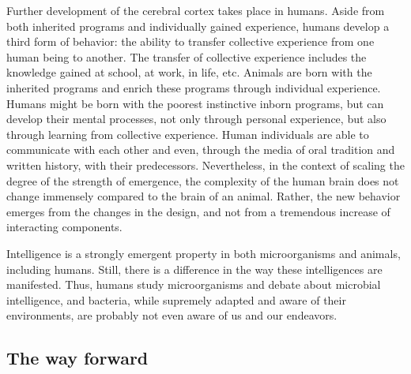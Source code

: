 Further development of the cerebral cortex takes place in humans. Aside from both inherited programs and individually gained experience, humans develop a third form of behavior: the ability to transfer collective experience from one human being to another. The transfer of collective experience includes the knowledge gained at school, at work, in life, etc. Animals are born with the inherited programs and enrich these programs through individual experience. Humans might be born with the poorest instinctive inborn programs, but can develop their mental processes, not only through personal experience, but also through learning from collective experience. Human individuals are able to communicate with each other and even, through the media of oral tradition and written history, with their predecessors. Nevertheless, in the context of scaling the degree of the strength of emergence, the complexity of the human brain does not change immensely compared to the brain of an animal. Rather, the new behavior emerges from the changes in the design, and not from a tremendous increase of interacting components.

Intelligence is a strongly emergent property in both microorganisms and animals, including humans. Still, there is a difference in the way these intelligences are manifested. Thus, humans study microorganisms and debate about microbial intelligence, and bacteria, while supremely adapted and aware of their environments, are probably not even aware of us and our endeavors.

\subsection{The way forward}

